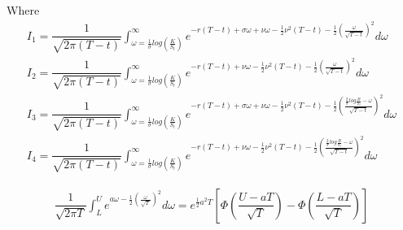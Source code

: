 Where
\begin{align*}
	I_1=\dfrac{1}{\sqrt{2\pi (T-t)}}\displaystyle \int_{\omega =\frac{1}{\sigma}log\left(\frac{K}{S_t}\right) }^{\infty}e^{-r(T-t)+\sigma \omega+ \nu\omega-\frac{1}{2}\nu^2(T-t)-\frac{1}{2}\left(\frac{\omega}{\sqrt{T-t}}\right)^2}d\omega\\
	I_2=\dfrac{1}{\sqrt{2\pi (T-t)}}\displaystyle \int_{\omega =\frac{1}{\sigma}log\left(\frac{K}{S_t}\right) }^{\infty}e^{-r(T-t)+ \nu\omega-\frac{1}{2}\nu^2(T-t)-\frac{1}{2}\left(\frac{\omega}{\sqrt{T-t}}\right)^2}d\omega\\
	I_3=\dfrac{1}{\sqrt{2\pi (T-t)}}\displaystyle \int_{\omega =\frac{1}{\sigma}log\left(\frac{K}{S_t}\right) }^{\infty}e^{-r(T-t)+\sigma \omega+ \nu\omega-\frac{1}{2}\nu^2(T-t)-\frac{1}{2}\left(\frac{\frac{2}{\sigma}log\frac{B}{S_t}-\omega}{\sqrt{T-t}}\right)^2}d\omega\\
	I_4=\dfrac{1}{\sqrt{2\pi (T-t)}}\displaystyle \int_{\omega =\frac{1}{\sigma}log\left(\frac{K}{S_t}\right) }^{\infty}e^{-r(T-t)+ \nu\omega-\frac{1}{2}\nu^2(T-t)-\frac{1}{2}\left(\frac{\frac{2}{\sigma}log\frac{B}{S_t}-\omega}{\sqrt{T-t}}\right)^2}d\omega
\end{align*}

 \vspace{0.2cm}

\begin{align}
	\dfrac{1}{\sqrt{2\pi T}}\displaystyle \int_{L}^{U}e^{a\omega-\frac{1}{2}(\frac{\omega}{\sqrt{T}})^2}d\omega=e^{\frac{1}{2}a^2T}\left[\Phi\left(\dfrac{U-aT}{\sqrt{T}}\right)-\Phi\left(\dfrac{L-aT}{\sqrt{T}}\right)\right]  \label{eq6.0.1}
\end{align}

 \\ \vspace{0.3cm}

